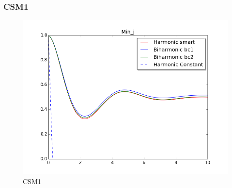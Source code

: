 \subsubsection*{CSM1}
\begin{figure}[H]
\label{fig:fluid_structure}
\caption{CSM1}
\includegraphics[scale=0.60, trim={0mm 0mm 0mm 0mm},clip]{./Verification_Validation/Mesh_motion_results/CSM1.png}
\end{figure}

